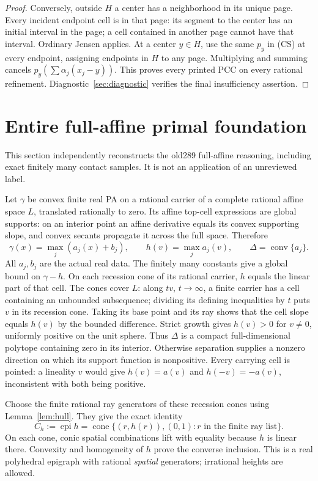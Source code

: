 \documentclass[11pt]{article}
\newcommand{\epi}{\operatorname{epi}}
\newcommand{\conv}{\operatorname{conv}}
\begin{document}
\begin{proof}
Conversely, outside $H$ a center has a neighborhood in its unique page. Every incident endpoint cell is in that page: its segment to the center has an initial interval in the page; a cell contained in another page cannot have that interval. Ordinary Jensen applies. At a center $y\in H$, use the same $p_y$ in (CS) at every endpoint, assigning endpoints in $H$ to any page. Multiplying and summing cancels $p_y(\sum\alpha_j(x_j-y))$. This proves every printed PCC on every rational refinement. Diagnostic~\ref{sec:diagnostic} verifies the final insufficiency assertion.
\end{proof}

\section{Entire full-affine primal foundation}\label{sec:primal}
This section independently reconstructs the old289 full-affine reasoning, including exact finitely many contact samples. It is not an application of an unreviewed label.

Let $\gamma$ be convex finite real PA on a rational carrier of a complete rational affine space $L$, translated rationally to zero. Its affine top-cell expressions are global supports: on an interior point an affine derivative equals its convex supporting slope, and convex secants propagate it across the full space. Therefore
\[
 \gamma(x)=\max_j(a_j(x)+b_j),\qquad h(v)=\max_ja_j(v),\qquad\Delta=\conv\{a_j\}.
\]
All $a_j,b_j$ are the actual real data. The finitely many constants give a global bound on $\gamma-h$. On each recession cone of its rational carrier, $h$ equals the linear part of that cell. The cones cover $L$: along $tv$, $t\to\infty$, a finite carrier has a cell containing an unbounded subsequence; dividing its defining inequalities by $t$ puts $v$ in its recession cone. Taking its base point and its ray shows that the cell slope equals $h(v)$ by the bounded difference. Strict growth gives $h(v)>0$ for $v\ne0$, uniformly positive on the unit sphere. Thus $\Delta$ is a compact full-dimensional polytope containing zero in its interior. Otherwise separation supplies a nonzero direction on which its support function is nonpositive. Every carrying cell is pointed: a lineality $v$ would give $h(v)=a(v)$ and $h(-v)=-a(v)$, inconsistent with both being positive.

Choose the finite rational ray generators of these recession cones using Lemma~\ref{lem:hull}. They give the exact identity
\[
 C_h:=\epi h=\operatorname{cone}\{(r,h(r)),(0,1):r\text{ in the finite ray list}\}.            \tag{RC}
\]
On each cone, conic spatial combinations lift with equality because $h$ is linear there. Convexity and homogeneity of $h$ prove the converse inclusion. This is a real polyhedral epigraph with rational \emph{spatial} generators; irrational heights are allowed.
\end{document}
